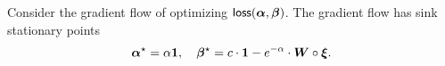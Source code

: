 \begin{theorem}\label{appthm:main-1}
Consider the gradient flow of optimizing $\mathsf{loss}(\bm{\alpha}, \boldsymbol{\beta})$. The gradient flow has sink stationary points 
\[\bm{\alpha}^\star = \alpha \bm{1}, \quad \boldsymbol{\beta}^\star = c \cdot \bm{1} - e^{-\alpha} \cdot \bm{W}\circ \bm{\xi}.\]
\end{theorem}

